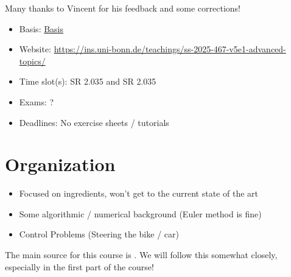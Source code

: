 Many thanks to Vincent for his feedback and some corrections!

\begin{tcolorbox}[enhanced,breakable,
	title=General Information,frame style={color=mycolor}]
    \begin{itemize}
        \item Basis: \href{https://basis.uni-bonn.de/qisserver/rds?state=verpublish&status=init&vmfile=no&publishid=261270&moduleCall=webInfo&publishConfFile=webInfo&publishSubDir=veranstaltung}{Basis}
        \item Website: \href{https://ins.uni-bonn.de/teachings/ss-2025-467-v5e1-advanced-topics/}{https://ins.uni-bonn.de/teachings/ss-2025-467-v5e1-advanced-topics/}
        \item Time slot(s):  SR 2.035 and  SR 2.035
        \item Exams: ?
        \item Deadlines: No exercise sheets / tutorials
    \end{itemize}
\end{tcolorbox}

\section{Organization}

\begin{itemize}
    \item Focused on ingredients, won't get to the current state of the art
    \item Some algorithmic / numerical background (Euler method is fine)
    \item Control Problems (Steering the bike / car)
\end{itemize}

The main source for this course is \cite{Meyn_2022}. We will follow this somewhat closely, especially in the first part of the course!